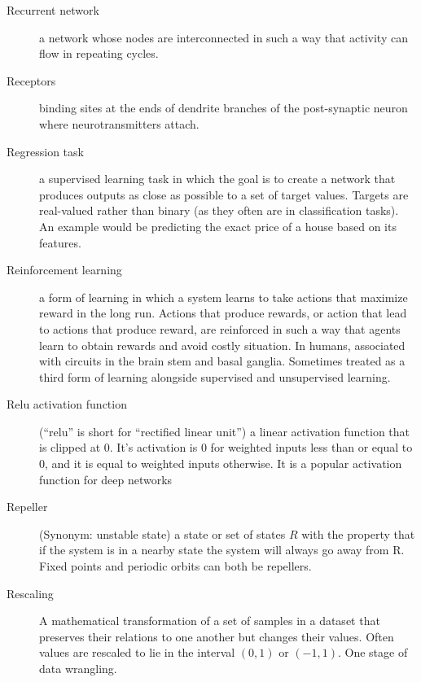 \begin{description}

\item[Recurrent network] a network whose nodes are interconnected in such a way that activity can flow in repeating cycles.

\item[Receptors] binding sites at the ends of dendrite branches of the post-synaptic neuron where neurotransmitters attach.


\item[Regression task] a supervised learning task in which the goal is to create a network that produces outputs as close as possible to a set of target values. Targets are real-valued rather than binary (as they often are in classification tasks). An example would be predicting the exact price of a house based on its features.

\item[Reinforcement learning] a form of learning in which a system learns to take actions that maximize reward in the long run.   Actions that produce rewards, or action that lead to actions that produce reward, are reinforced in such a way that agents learn to obtain rewards and avoid costly situation.  In humans, associated with circuits in the brain stem and basal ganglia.  Sometimes treated as a third form of learning alongside supervised and unsupervised learning.

\item[Relu activation function] (``relu'' is short for ``rectified linear unit'') a linear activation function that is clipped at  0. It's activation is 0 for weighted inputs less than or equal to 0, and it is equal to weighted inputs otherwise. It is a popular activation function for deep networks

\item[Repeller] (Synonym: unstable state) a state or set of states $R$ with the property that if the system is in a nearby state the system will always go away from R. Fixed points and periodic orbits can both be repellers.

\item[Rescaling] A mathematical transformation of a set of samples in a dataset that preserves their relations to one another but changes their values. Often values are rescaled to lie in the interval $(0,1)$ or $(-1,1)$. One stage of data wrangling.


\end{description}
